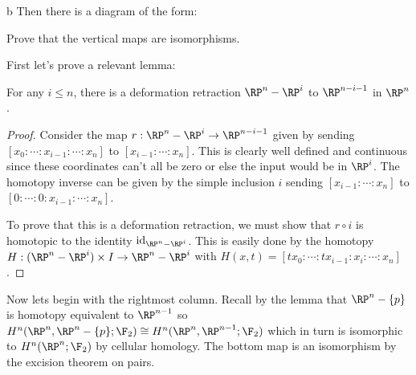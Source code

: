 \documentclass[11pt,letterpaper]{article}
\begin{document}
\begin{solution}
\begin{partproblem}{b}
        \medskip
        \quad Then there is a diagram of the form:
        \begin{center}
        \end{center}   
        Prove that the vertical maps are isomorphisms. %
    \end{partproblem}

    \quad First let's prove a relevant lemma:
    \begin{claim}
        For any $i\leq n$, there is a deformation retraction $\RP^n-\RP^i$ to $\RP^{n-i-1}$ in $\RP^n$.
    \end{claim}

    \begin{proof}
        Consider the map $r : \RP^n-\RP^i \to \RP^{n-i-1}$ given by sending $[x_0 : \cdots : x_{i-1} :\cdots :x_n]$ to $[x_{i-1} : \cdots : x_n]$. This is clearly well defined and continuous since these coordinates can't all be zero or else the input would be in $\RP^i$. The homotopy inverse can be given by the simple inclusion $i$ sending $[x_{i-1} : \cdots : x_n]$ to $[0 : \cdots : 0 : x_{i-1} : \cdots : x_n]$.

        \quad To prove that this is a deformation retraction, we must show that $r\circ i$ is homotopic to the identity $\text{id}_{\RP^n - \RP^i}$. This is easily done by the homotopy $H : (\RP^n - \RP^i)\times I \to \RP^n-\RP^i$ with $H(x, t) = [tx_0 : \cdots : tx_{i-1} : x_i : \cdots : x_n]$. 
    \end{proof}
    
    \quad Now lets begin with the rightmost column. Recall by the lemma that $\RP^n-\{p\}$ is homotopy equivalent to $\RP^{n-1}$ so $H^n(\RP^n, \RP^n-\{p\}; \F_2)\cong H^n(\RP^n, \RP^{n-1}; \F_2)$ which in turn is isomorphic to $H^n(\RP^n; \F_2)$ by cellular homology. The bottom map is an isomorphism by the excision theorem on pairs.


\end{solution}
\end{document}

